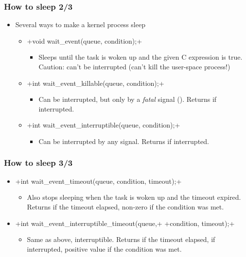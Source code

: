 \begin{frame}[fragile]
  \frametitle{How to sleep 2/3}
  \begin{itemize}
  \item Several ways to make a kernel process sleep
    \begin{itemize}
    \item {}+void wait_event(queue, condition);+
      \begin{itemize}
      \item Sleeps until the task is woken up and the given C
        expression is true. Caution: can't be interrupted (can't kill
        the user-space process!)
      \end{itemize}
    \item {}+int wait_event_killable(queue, condition);+
      \begin{itemize}
      \item Can be interrupted, but only by a \emph{fatal} signal
        (). Returns \code{-} if interrupted.
      \end{itemize}
    \item {}+int wait_event_interruptible(queue, condition);+
      \begin{itemize}
      \item Can be interrupted by any signal. Returns
        \code{-} if interrupted.
      \end{itemize}
    \end{itemize}
  \end{itemize}
\end{frame}

\begin{frame}[fragile]
  \frametitle{How to sleep 3/3}
  \begin{itemize}
  \item {}+int wait_event_timeout(queue, condition, timeout);+
    \begin{itemize}
    \item Also stops sleeping when the task is woken up and the
      timeout expired. Returns  if the timeout elapsed, non-zero if
      the condition was met.
    \end{itemize}
  \item {}+int wait_event_interruptible_timeout(queue,+
    +condition, timeout);+
    \begin{itemize}
    \item Same as above, interruptible. Returns  if the timeout
      elapsed, \code{-} if interrupted, positive value if
      the condition was met.
    \end{itemize}
  \end{itemize}
\end{frame}

